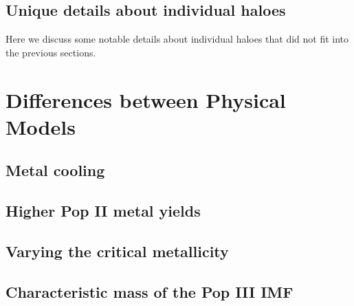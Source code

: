 \documentclass[useAMS,usenatbib]{mn2e}
\begin{document}

\subsection{Unique details about individual haloes}

Here we discuss some notable details about individual haloes that did
not fit into the previous sections.












\section{Differences between Physical Models}
\label{sec:models}

\subsection{Metal cooling}

\subsection{Higher Pop II metal yields}

\subsection{Varying the critical metallicity}

\subsection{Characteristic mass of the Pop III IMF}
\end{document}
